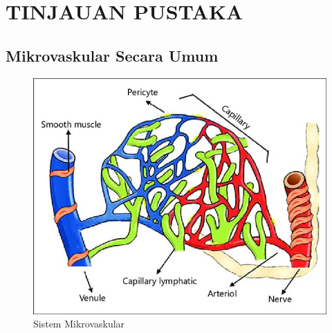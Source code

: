 \chapter{TINJAUAN PUSTAKA}



\section{Mikrovaskular Secara Umum}

\begin{figure}[H]
	\centering
	\includegraphics[scale=0.7]{gambar/mikrovaskular.jpg}
	\caption{ Sistem Mikrovaskular \cite{guven_microcirculation_2020}}
	\label{fig:mikrovaskular}
\end{figure}


